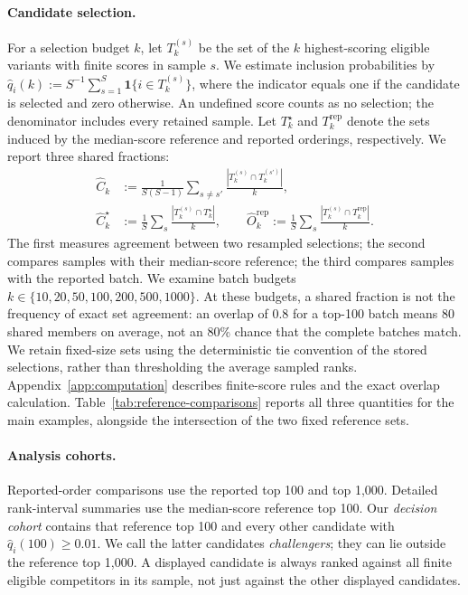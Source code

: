 \documentclass[11pt]{article}
\begin{document}
\paragraph{Candidate selection.}
For a selection budget $k$, let $T_k^{(s)}$ be the set of the $k$ highest-scoring
eligible variants with finite scores in sample $s$. We estimate inclusion
probabilities by $\hat q_i(k):=S^{-1}\sum_{s=1}^S\mathbf{1}\{i\in T_k^{(s)}\}$,
where the indicator equals one if the candidate is selected and zero otherwise.
An undefined score counts as no selection; the denominator includes every
retained sample. Let
$T_k^\star$ and $T_k^{\mathrm{rep}}$ denote the sets induced by the median-score
reference and reported orderings, respectively. We report three shared fractions:
\begin{align}
\widehat C_k
&:=\frac{1}{S(S-1)}\sum_{s\ne s'}
\frac{|T_k^{(s)}\cap T_k^{(s')}|}{k},\\
\widehat C_k^\star
&:=\frac{1}{S}\sum_s\frac{|T_k^{(s)}\cap T_k^\star|}{k},\qquad
\widehat O_k^{\mathrm{rep}}
:=\frac{1}{S}\sum_s\frac{|T_k^{(s)}\cap T_k^{\mathrm{rep}}|}{k}.
\end{align}
The first measures agreement between two resampled selections; the second
compares samples with their median-score reference; the third compares samples
with the reported batch. We examine batch budgets
$k\in\{10,20,50,100,200,500,1000\}$. At these budgets, a shared fraction
is not the frequency of exact set agreement: an overlap of 0.8 for a
top-100 batch means 80 shared members on average, not an 80\% chance that
the complete batches match.
We retain fixed-size sets using the deterministic tie convention of the
stored selections, rather than thresholding the average sampled ranks.
Appendix~\ref{app:computation} describes finite-score rules and the exact
overlap calculation. Table~\ref{tab:reference-comparisons} reports all three
quantities for the main examples, alongside the intersection of the two
fixed reference sets.

\paragraph{Analysis cohorts.}
Reported-order comparisons use the reported top 100 and top 1,000. Detailed
rank-interval summaries use the median-score reference top 100. Our
\emph{decision cohort} contains that reference top 100 and every other
candidate with $\hat q_i(100)\geq0.01$. We call the latter candidates
\emph{challengers}; they can lie outside the reference top 1,000.
A displayed candidate is always ranked
against all finite eligible competitors in its sample, not just against the
other displayed candidates.
\end{document}
